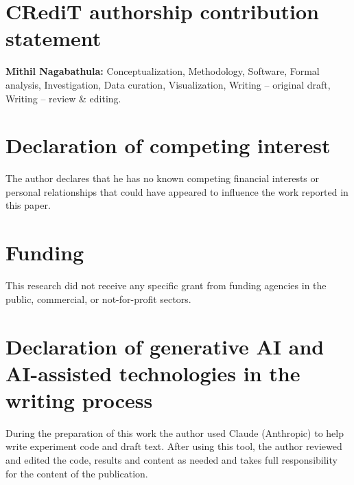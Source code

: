 \documentclass[preprint,12pt,authoryear]{elsarticle}
\begin{document}
\section*{CRediT authorship contribution statement}
\textbf{Mithil Nagabathula:} Conceptualization, Methodology, Software, Formal analysis, Investigation, Data curation,
Visualization, Writing -- original draft, Writing -- review \& editing.

\section*{Declaration of competing interest}
The author declares that he has no known competing financial interests or personal relationships that could have appeared to
influence the work reported in this paper.

\section*{Funding}
This research did not receive any specific grant from funding agencies in the public, commercial, or not-for-profit sectors.

\section*{Declaration of generative AI and AI-assisted technologies in the writing process}
During the preparation of this work the author used Claude (Anthropic) to help write experiment code and draft text. After
using this tool, the author reviewed and edited the code, results and content as needed and takes full responsibility for the
content of the publication.



\end{document}

